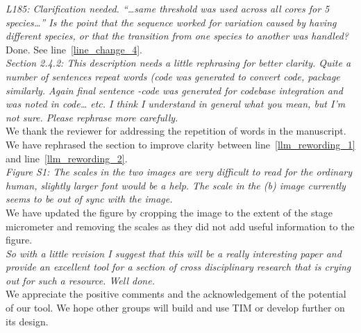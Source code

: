 \documentclass[12pt,a4paper]{article}
\newcommand{\lr}[1]{line~\ref{#1}}
\begin{document}
\emph{L185: Clarification needed. “…same threshold was used across all cores for 5 species…” Is the point that the sequence worked for variation caused by having different species, or that the transition from one species to another was handled?}\\

Done. See \lr{line_change_4}. \\

\emph{Section 2.4.2: This description needs a little rephrasing for better clarity. Quite a number of sentences repeat words (code was generated to convert code, package similarly. Again final sentence -code was generated for codebase integration and was noted in code… etc. I think I understand in general what you mean, but I’m not sure. Please rephrase more carefully.}\\

We thank the reviewer for addressing the repetition of words in the manuscript. We have rephrased the section to improve clarity between \lr{llm_rewording_1} and \lr{llm_rewording_2}. \\

\emph{Figure S1: The scales in the two images are very difficult to read for the ordinary human, slightly larger font would be a help. The scale in the (b) image currently seems to be out of sync with the image.} \\

We have updated the figure by cropping the image to the extent of the stage micrometer and removing the scales as they did not add useful information to the figure. \\ 

\emph{So with a little revision I suggest that this will be a really interesting paper and provide an excellent tool for a section of cross disciplinary research that is crying out for such a resource. Well done.}\\

We appreciate the positive comments and the acknowledgement of the potential of our tool. We hope other groups will build and use TIM or develop further on its design. \\ 

\newpage
% 
% 
\end{document}

